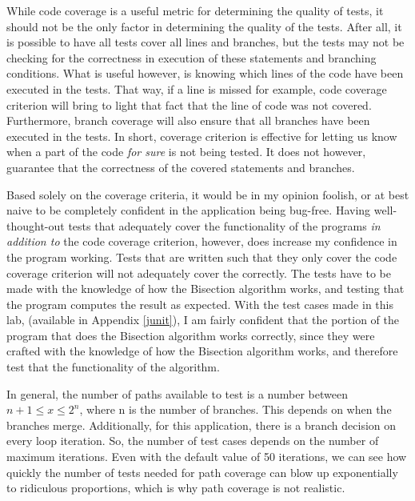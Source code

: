 While code coverage is a useful metric for determining the quality of tests, it
should not be the only factor in determining the quality of the tests. After
all, it is possible to have all tests cover all lines and branches, but the
tests may not be checking for the correctness in execution of these statements
and branching conditions.  What is useful however, is knowing which lines of
the code have been executed in the tests. That way, if a line is missed for
example, code coverage criterion will bring to light that fact that the line of
code was not covered. Furthermore, branch coverage will also ensure that all
branches have been executed in the tests. In short, coverage criterion is
effective for letting us know when a part of the code \textit{for sure} is not
being tested. It does not however, guarantee that the correctness of the
covered statements and branches.

Based solely on the coverage criteria, it would be in my opinion foolish,
or at best naive to be completely confident in the application being bug-free.
Having well-thought-out tests that adequately cover the functionality of the
programs \textit{in addition to} the code coverage criterion, however, does
increase my confidence in the program working. Tests that are written such that 
they only cover the code coverage criterion will not adequately cover the 
correctly. The tests have to be made with the knowledge of how the Bisection
algorithm works, and testing that the program computes the result as expected.
With the test cases made in this lab, (available in Appendix \ref{junit}),
I am fairly confident that the portion of the program that does the Bisection
algorithm works correctly, since they were crafted with the knowledge
of how the Bisection algorithm works, and therefore test that the functionality
of the algorithm.

In general, the number of paths available to test is a number between
$n+1 \leq x \leq 2^n$, where n is the number of branches. This depends
on when the branches merge. Additionally, for this application,
there is a branch decision on every loop iteration. So, the number of test
cases depends on the number of maximum iterations. Even with the default value
of 50 iterations, we can see how quickly the number of tests needed for path
coverage can blow up exponentially to ridiculous proportions, which is why
path coverage is not realistic. 
